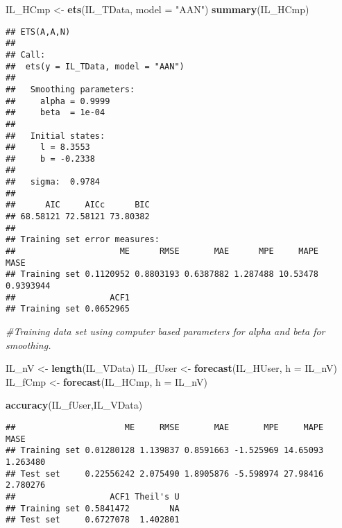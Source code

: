 \documentclass[
]{article}
\newenvironment{Shaded}{\begin{snugshade}}{\end{snugshade}}
\newcommand{\CommentTok}[1]{\textcolor[rgb]{0.56,0.35,0.01}{\textit{#1}}}
\newcommand{\DataTypeTok}[1]{\textcolor[rgb]{0.13,0.29,0.53}{#1}}
\newcommand{\KeywordTok}[1]{\textcolor[rgb]{0.13,0.29,0.53}{\textbf{#1}}}
\newcommand{\NormalTok}[1]{#1}
\newcommand{\StringTok}[1]{\textcolor[rgb]{0.31,0.60,0.02}{#1}}
\begin{document}
\begin{Shaded}
\begin{Highlighting}[]
\NormalTok{IL_HCmp <-}\StringTok{ }\KeywordTok{ets}\NormalTok{(IL_TData, }\DataTypeTok{model =} \StringTok{"AAN"}\NormalTok{)}
\KeywordTok{summary}\NormalTok{(IL_HCmp)}
\end{Highlighting}
\end{Shaded}

\begin{verbatim}
## ETS(A,A,N) 
## 
## Call:
##  ets(y = IL_TData, model = "AAN") 
## 
##   Smoothing parameters:
##     alpha = 0.9999 
##     beta  = 1e-04 
## 
##   Initial states:
##     l = 8.3553 
##     b = -0.2338 
## 
##   sigma:  0.9784
## 
##      AIC     AICc      BIC 
## 68.58121 72.58121 73.80382 
## 
## Training set error measures:
##                     ME      RMSE       MAE      MPE     MAPE      MASE
## Training set 0.1120952 0.8803193 0.6387882 1.287488 10.53478 0.9393944
##                   ACF1
## Training set 0.0652965
\end{verbatim}

\begin{Shaded}
\begin{Highlighting}[]
\CommentTok{#Training data set using computer based parameters for alpha and beta for smoothing.}
\end{Highlighting}
\end{Shaded}

\begin{Shaded}
\begin{Highlighting}[]
\NormalTok{IL_nV <-}\StringTok{ }\KeywordTok{length}\NormalTok{(IL_VData)}
\NormalTok{IL_fUser <-}\StringTok{ }\KeywordTok{forecast}\NormalTok{(IL_HUser, }\DataTypeTok{h =}\NormalTok{ IL_nV)}
\NormalTok{IL_fCmp <-}\StringTok{ }\KeywordTok{forecast}\NormalTok{(IL_HCmp, }\DataTypeTok{h =}\NormalTok{ IL_nV)}
\end{Highlighting}
\end{Shaded}

\begin{Shaded}
\begin{Highlighting}[]
\KeywordTok{accuracy}\NormalTok{(IL_fUser,IL_VData)}
\end{Highlighting}
\end{Shaded}

\begin{verbatim}
##                      ME     RMSE       MAE       MPE     MAPE     MASE
## Training set 0.01280128 1.139837 0.8591663 -1.525969 14.65093 1.263480
## Test set     0.22556242 2.075490 1.8905876 -5.598974 27.98416 2.780276
##                   ACF1 Theil's U
## Training set 0.5841472        NA
## Test set     0.6727078  1.402801
\end{verbatim}
\end{document}
